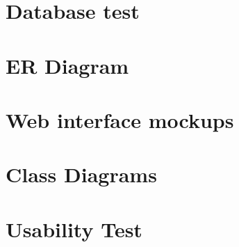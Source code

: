     \section{Database test}
      \label{app:dbTest}
      
    \section{ER Diagram}
    \label{errDiagram}
      
    \section{Web interface mockups}
      
      \label{app:Mock}
    \section{Class Diagrams}
    \label{app:Class-diagrams}
      
    
   \section{Usability Test}
      
      \label{app:quest}



\appendix


